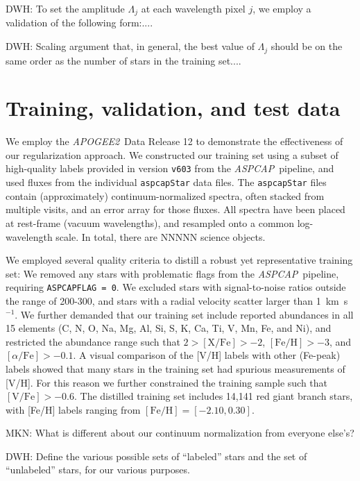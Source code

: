 \documentclass[12pt,preprint]{aastex}
\newcommand{\project}[1]{\textsl{#1}}
\newcommand{\acronym}[1]{{\small{#1}}}
\newcommand{\apogee}{\project{\acronym{APOGEE2}}}
\newcommand{\aspcap}{\project{\acronym{ASPCAP}}}
\begin{document}
DWH: To set the amplitude $\Lambda_j$ at each wavelength pixel $j$, we
employ a validation of the following form:....

DWH: Scaling argument that, in general, the best value of $\Lambda_j$
should be on the same order as the number of stars in the training
set....

\section{Training, validation, and test data}


We employ the \apogee\ Data Release 12 to demonstrate the effectiveness of our 
regularization approach.   We constructed our training set using a subset of 
high-quality labels provided in version \texttt{v603} from the \aspcap\ 
pipeline, and used fluxes from the individual \texttt{aspcapStar} data files.
The \texttt{aspcapStar} files contain (approximately) continuum-normalized 
spectra, often stacked from multiple visits, and an error array for those 
fluxes.  All spectra have been placed at rest-frame (vacuum wavelengths), and
resampled onto a common log-wavelength scale. In total, there are NNNNN science
objects.

We employed several quality criteria to distill a robust yet representative 
training set: We removed any stars with problematic flags from the \aspcap\
pipeline, requiring \texttt{ASPCAPFLAG = 0}.  We excluded stars with 
signal-to-noise ratios outside the range of 200-300, and stars with a radial 
velocity scatter larger than 1~km~s$^{-1}$.  We further demanded that
our training set include reported abundances in all 15 elements (C, N, O, Na, 
Mg, Al, Si, S, K, Ca, Ti, V, Mn, Fe, and Ni), and restricted the abundance range
such that $2 > \mathrm{[X/Fe]} > -2$, $\mathrm{[Fe/H]} > -3$, and 
$[\alpha/\mathrm{Fe}] > -0.1$.  A visual comparison of the [V/H] labels
with other (Fe-peak) labels showed that many stars in the training set had
spurious measurements of [V/H]. For this reason we further constrained the
training sample such that $\mathrm{[V/Fe]} > -0.6$.  The distilled training
set includes 14,141 red giant branch stars, with [Fe/H] labels ranging from
$\mathrm{[Fe/H]} = [-2.10, 0.30]$. 






MKN: What is different about our continuum normalization from everyone else's?

DWH: Define the various possible sets of ``labeled'' stars and the set of ``unlabeled''
stars, for our various purposes.
\end{document}
